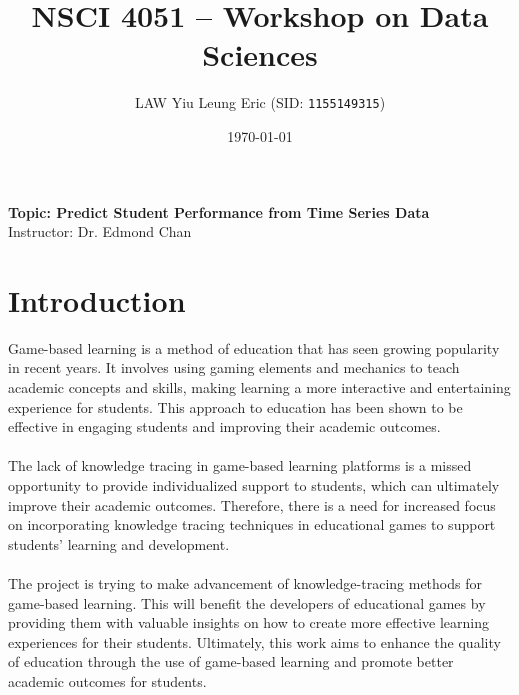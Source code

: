 \documentclass[11pt,a4paper]{article}
\begin{document}
    
    \thispagestyle{empty}
    \title{\textsc{NSCI 4051} -- Workshop on Data Sciences}
    \author{
        LAW Yiu Leung Eric (SID: \texttt{1155149315})
    }
    \date{\today}
    \maketitle

    \begin{center}
        {\Large \textbf{Topic: Predict Student Performance from Time Series Data}} \\
        Instructor: Dr. Edmond Chan
    \end{center}
    
    \pagestyle{plain} 
    
    \tableofcontents
    \listoffigures
    \listoftables
    
    \newpage

    \pagestyle{fancy}
    \setcounter{page}{1}
    
    \section{Introduction}
    Game-based learning is a method of education that has seen growing popularity in recent years. It involves using gaming elements and mechanics to teach academic concepts and skills, making learning a more interactive and entertaining experience for students. This approach to education has been shown to be effective in engaging students and improving their academic outcomes. \\
    \\
    The lack of knowledge tracing in game-based learning platforms is a missed opportunity to provide individualized support to students, which can ultimately improve their academic outcomes. Therefore, there is a need for increased focus on incorporating knowledge tracing techniques in educational games to support students' learning and development. \\
    \\
    The project is trying to make advancement of knowledge-tracing methods for game-based learning. This will benefit the developers of educational games by providing them with valuable insights on how to create more effective learning experiences for their students. Ultimately, this work aims to enhance the quality of education through the use of game-based learning and promote better academic outcomes for students.
\end{document}
